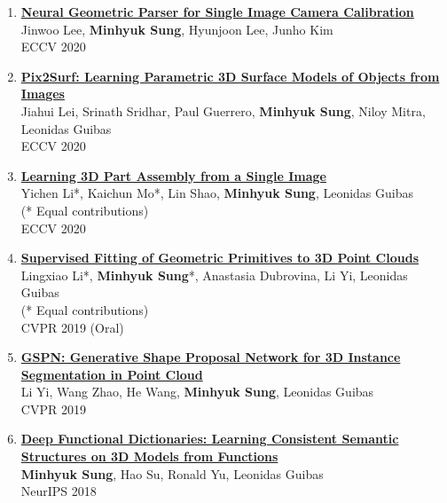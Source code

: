 \documentclass[letterpaper,10pt]{article} %
\newcommand{\blankline}{\quad\pagebreak[2]}
\begin{document}
{{\begin{enumerate}
\item \label{eccv20_3}
\href{https://arxiv.org/abs/2007.11855}{\textbf{Neural Geometric Parser for Single Image Camera Calibration}}\\
Jinwoo Lee, \textbf{Minhyuk Sung}, Hyunjoon Lee, Junho Kim\\
ECCV 2020\\
\blankline

\item \label{eccv20_2}
\href{https://geometry.stanford.edu/projects/pix2surf/}{\textbf{Pix2Surf: Learning Parametric 3D Surface Models of Objects from Images}}\\
Jiahui Lei, Srinath Sridhar, Paul Guerrero, \textbf{Minhyuk Sung}, Niloy Mitra, Leonidas Guibas\\
ECCV 2020\\
\blankline

\item \label{eccv20_1}
\href{https://cs.stanford.edu/~kaichun/impartass/}{\textbf{Learning 3D Part Assembly from a Single Image}}\\
Yichen Li*, Kaichun Mo*, Lin Shao, \textbf{Minhyuk Sung}, Leonidas Guibas\\
(* Equal contributions)\\
ECCV 2020\\
\blankline

\item \label{cvpr19_2}
\href{https://arxiv.org/abs/1811.08988}{\textbf{Supervised Fitting of Geometric Primitives to 3D Point Clouds}}\\
Lingxiao Li*, \textbf{Minhyuk Sung}*, Anastasia Dubrovina, Li Yi, Leonidas Guibas\\
(* Equal contributions)\\
CVPR 2019 (Oral)\\
\blankline

\item \label{cvpr19_1}
\href{https://arxiv.org/abs/1812.03320}{\textbf{GSPN: Generative Shape Proposal Network for 3D Instance Segmentation in Point Cloud}}\\
Li Yi, Wang Zhao, He Wang, \textbf{Minhyuk Sung}, Leonidas Guibas\\
CVPR 2019\\
\blankline

\item \label{neurips18}
\href{https://arxiv.org/abs/1805.09957}{\textbf{Deep Functional Dictionaries: Learning Consistent Semantic Structures on 3D Models from Functions}}\\
\textbf{Minhyuk Sung}, Hao Su, Ronald Yu, Leonidas Guibas\\
NeurIPS 2018\\
\blankline


\end{enumerate}}}
\end{document}
